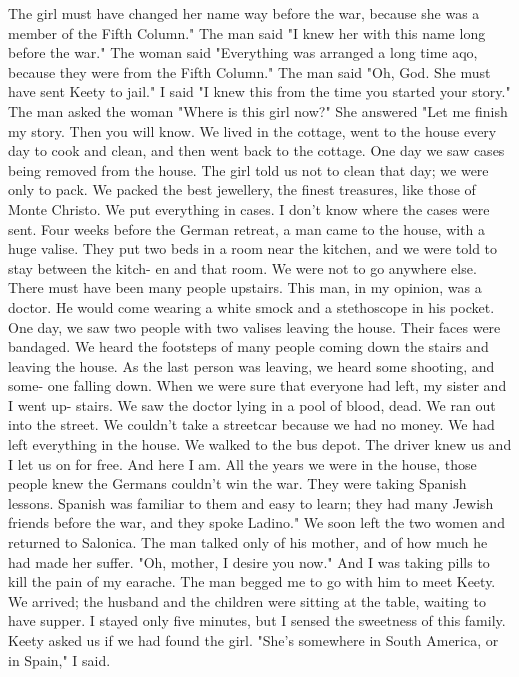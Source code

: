 The girl must have changed her name way before the war, because she was a member of the 
Fifth Column."
The man said "I knew her with this name long before the war."
The woman said "Everything was arranged a long time aqo, because they were from the Fifth Column."
The man said "Oh, God.
She must have sent Keety to jail."
I said "I knew this from the time you started your story."
The man asked the woman "Where is this girl now?"
She answered "Let me finish my story.
Then you will know.
We lived in the cottage, 
went to the house every day to cook and clean, and then went back to the cottage.
One day 
we saw cases being removed from the house.
The girl told us not to clean that day; we 
were only to pack.
We packed the best jewellery, the finest treasures, like those of 
Monte Christo.
We put everything in cases.
I don't know where the cases were sent.
Four weeks before the German retreat, a man came to the house, with a huge valise.
They put two beds in a room near the kitchen, and we were told to stay between the kitch-
en and that room.
We were not to go anywhere else.
There must have been many people 
upstairs.
This man, in my opinion, was a doctor.
He would come wearing a white smock and a 
stethoscope in his pocket.
One day, we saw two people with two valises leaving the house.
Their faces were bandaged.
We heard the footsteps of many people coming down the stairs 
and leaving the house.
As the last person was leaving, we heard some shooting, and some-
one falling down.
When we were sure that everyone had left, my sister and I went up-
stairs.
We saw the doctor lying in a pool of blood, dead.
We ran out into the street.
We couldn't take a streetcar because we had no money.
We had left everything in the house.
We walked to the bus depot.
The driver knew us and I 
let us on for free.
And here I am.
All the years we were in the house, those people knew the Germans couldn't win the 
war.
They were taking Spanish lessons.
Spanish was familiar to them and easy to learn; 
they had many Jewish friends before the war, and they spoke Ladino."
We soon left the two women and returned to Salonica.
The man talked only of his 
mother, and of how much he had made her suffer.
"Oh, mother, I desire you now."
And I 
was taking pills to kill the pain of my earache.
The man begged me to go with him to 
meet Keety.
We arrived; the husband and the children were sitting at the table, waiting to have supper.
I stayed only five minutes, but I sensed the sweetness of this family.
Keety asked us if we had found the girl.
"She's somewhere in South America, or in Spain," I said.
